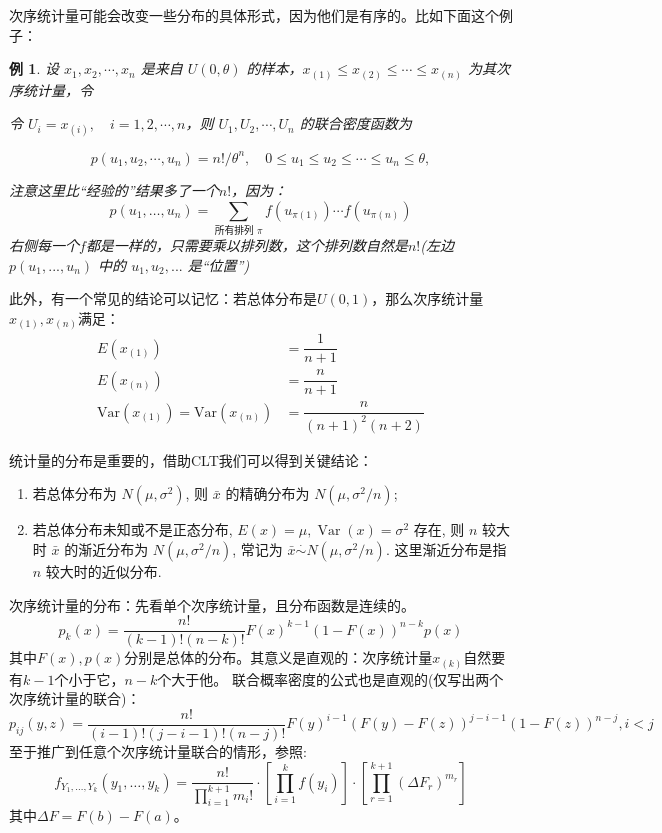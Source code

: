 \documentclass[a4paper]{ctexart}
\newtheorem{example}{例}[section]
\begin{document}
\begin{tipbox}
    次序统计量可能会改变一些分布的具体形式，因为他们是有序的。比如下面这个例子：
    \begin{example}
        设 \(x_1, x_2, \cdots, x_n\) 是来自 \(U(0, \theta)\) 的样本，\(x_{(1)} \leq x_{(2)} \leq \cdots \leq x_{(n)}\) 为其次序统计量，令

        令 \(U_i = x_{(i)}, \quad i = 1, 2, \cdots, n\)，则 \(U_1, U_2, \cdots, U_n\) 的联合密度函数为

        \[p(u_1, u_2, \cdots, u_n) = n! / \theta^n, \quad 0 \leq u_1 \leq u_2 \leq \cdots \leq u_n \leq \theta,\]

        注意这里比“经验的”结果多了一个$n!$，因为：
        $$p(u_1, \ldots, u_n) = \sum_{\text{所有排列 } \pi} f(u_{\pi(1)}) \cdots f(u_{\pi(n)})$$
        右侧每一个$f$都是一样的，只需要乘以排列数，这个排列数自然是$n!$(左边 $p(u_1, ..., u_n)$ 中的 $u_1, u_2, ...$ 是“位置”)
        
    \end{example}
    此外，有一个常见的结论可以记忆：若总体分布是$U(0,1)$，那么次序统计量$x_{(1)},x_{(n)}$满足：
    \begin{equation}
        \begin{aligned}
            E(x_{(1)})&=\dfrac{1}{n+1}\\
            E(x_{(n)})&=\dfrac{n}{n+1}\\
            \mathrm{Var}(x_{(1)})=\mathrm{Var}(x_{(n)})&=\dfrac{n}{(n+1)^2(n+2)}
        \end{aligned}
    \end{equation}
\end{tipbox}
统计量的分布是重要的，借助CLT我们可以得到关键结论：
\begin{enumerate}
    \item[(1)] 若总体分布为 \(N(\mu, \sigma^2)\), 则 \(\bar{x}\) 的精确分布为 \(N(\mu, \sigma^2/n)\);
    \item[(2)] 若总体分布未知或不是正态分布, \(E(x) = \mu, \operatorname{Var}(x) = \sigma^2\) 存在, 则 \(n\) 较大时 \(\bar{x}\) 的渐近分布为 \(N(\mu, \sigma^2/n)\), 常记为 \(\bar{x} \overset{\cdot}{\sim} N(\mu, \sigma^2/n)\). 这里渐近分布是指 \(n\) 较大时的近似分布.
\end{enumerate}
次序统计量的分布：先看单个次序统计量，且分布函数是连续的。
\begin{equation}
    p_k(x)=\dfrac{n!}{(k-1)!(n-k)!} F(x)^{k-1} (1-F(x))^{n-k} p(x)
\end{equation}
其中$F(x),p(x)$分别是总体的分布。其意义是直观的：次序统计量$x_{(k)}$自然要有$k-1$个小于它，$n-k$个大于他。
联合概率密度的公式也是直观的(仅写出两个次序统计量的联合)：
\begin{equation}
    p_{ij}(y,z)=\dfrac{n!}{(i-1)!(j-i-1)!(n-j)!} F(y)^{i-1}(F(y)-F(z))^{j-i-1}(1-F(z))^{n-j},i<j
\end{equation}
至于推广到任意个次序统计量联合的情形，参照:
\begin{equation}
    f_{Y_1, \dots, Y_k}(y_1, \dots, y_k) = \frac{n!}{\prod_{i=1}^{k+1} m_i!} \cdot \left[ \prod_{i=1}^{k} f(y_i) \right] \cdot \left[ \prod_{r=1}^{k+1} \left( \Delta F_r \right)^{m_r} \right]
\end{equation}
其中$\Delta F = F(b) - F(a)$。
\end{document}
